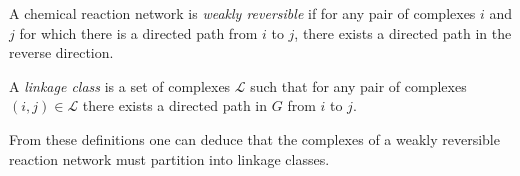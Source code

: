 \documentclass[smallextended]{svjour3}       %
\newcommand*{\0}{\mathbf{0}}
\newcommand*{\1}{\mathbf{1}}
\begin{document}
\begin{defn} 
	A chemical reaction network is \emph{weakly reversible} if for any
    pair of complexes $i$ and $j$ for which there is a directed path from 
    $i$ to $j$, there exists a directed path in the reverse direction.
\end{defn} 

\begin{defn} 
    A \emph{linkage class} is a set of complexes $\mathcal{L}$ such that for any pair of complexes
    $(i,j) \in \mathcal{L}$ there exists a directed path in $G$ from $i$ to $j$. 
\end{defn}

From these definitions one can deduce that the complexes of a weakly reversible 
reaction network must partition into linkage classes.
\end{document}
